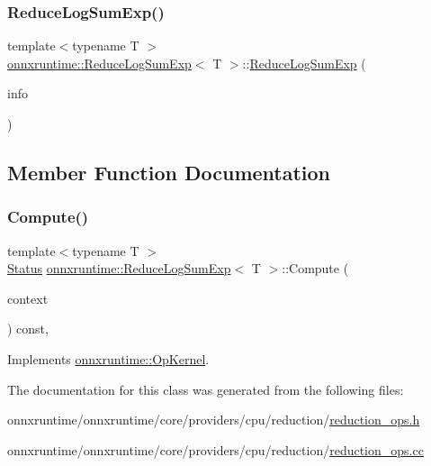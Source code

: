 \subsubsection{\texorpdfstring{Reduce\+Log\+Sum\+Exp()}{ReduceLogSumExp()}}
{\footnotesize\ttfamily template$<$typename T $>$ \\
\mbox{\hyperlink{classonnxruntime_1_1ReduceLogSumExp}{onnxruntime\+::\+Reduce\+Log\+Sum\+Exp}}$<$ T $>$\+::\mbox{\hyperlink{classonnxruntime_1_1ReduceLogSumExp}{Reduce\+Log\+Sum\+Exp}} (\begin{DoxyParamCaption}\item[{const \mbox{\hyperlink{classonnxruntime_1_1OpKernelInfo}{Op\+Kernel\+Info}} \&}]{info }\end{DoxyParamCaption})\hspace{0.3cm}{\ttfamily [inline]}}



\subsection{Member Function Documentation}
\mbox{\label{classonnxruntime_1_1ReduceLogSumExp_a822206beea2ef462036d53169b7a3dd7}} 
\subsubsection{\texorpdfstring{Compute()}{Compute()}}
{\footnotesize\ttfamily template$<$typename T $>$ \\
\mbox{\hyperlink{classonnxruntime_1_1common_1_1Status}{Status}} \mbox{\hyperlink{classonnxruntime_1_1ReduceLogSumExp}{onnxruntime\+::\+Reduce\+Log\+Sum\+Exp}}$<$ T $>$\+::Compute (\begin{DoxyParamCaption}\item[{\mbox{\hyperlink{classonnxruntime_1_1OpKernelContext}{Op\+Kernel\+Context}} $\ast$}]{context }\end{DoxyParamCaption}) const\hspace{0.3cm}{\ttfamily [override]}, {\ttfamily [virtual]}}



Implements \mbox{\hyperlink{classonnxruntime_1_1OpKernel_a9eca8656a78b1b3ab9d3351a12798650}{onnxruntime\+::\+Op\+Kernel}}.



The documentation for this class was generated from the following files\+:\begin{DoxyCompactItemize}
\item 
onnxruntime/onnxruntime/core/providers/cpu/reduction/\mbox{\hyperlink{cpu_2reduction_2reduction__ops_8h}{reduction\+\_\+ops.\+h}}\item 
onnxruntime/onnxruntime/core/providers/cpu/reduction/\mbox{\hyperlink{cpu_2reduction_2reduction__ops_8cc}{reduction\+\_\+ops.\+cc}}\end{DoxyCompactItemize}
